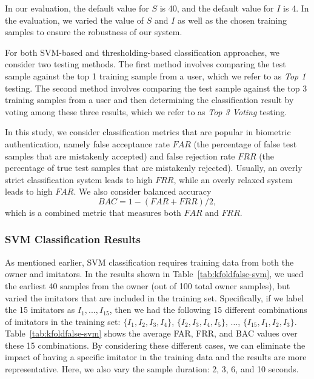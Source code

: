 In our evaluation, the default value for $S$ is 40, and the default value for 
$I$ is 4. In the evaluation, we varied the value of $S$ and $I$ as well as the 
chosen training samples to ensure the robustness of our system.

For both SVM-based and thresholding-based classification approaches, we 
consider two testing methods. The first method involves comparing the test 
sample against the top 1 training sample from a user, which we refer to as 
\emph{Top 1} testing. The second method involves comparing the test sample 
against the top 3 training samples from a user and then determining the 
classification result by voting among these three results, which we refer to 
as \emph{Top 3 Voting} testing.

In this study, we consider classification metrics that are popular in 
biometric authentication, namely false acceptance rate $FAR$ (the percentage 
of false test samples that are mistakenly accepted) and false rejection rate 
$FRR$ (the percentage of true test samples that are mistakenly rejected). 
Usually, an overly strict classification system leads to high $FRR$, while an 
overly relaxed system leads to high $FAR$. We also consider balanced accuracy 
$$BAC = 1 - (FAR+FRR)/2,$$ which is a combined metric that measures both $FAR$ 
and $FRR$.


\iffalse
\subsubsection{SVM Classification Results}

As mentioned earlier, SVM classification requires training data from both the 
owner and imitators. In the results shown in Table~\ref{tab:kfoldfalse-svm}, 
we used the earliest 40 samples from the owner (out of 100 total owner 
samples), but varied the imitators that are included in the training set. 
Specifically, if we label the 15 imitators as $I_1, ..., I_{15}$, then we had 
the following 15 different combinations of imitators in the training set: 
$\{I_1, I_2, I_3, I_4\}$, $\{I_2, I_3, I_4, I_5\}$, $\dots$, $\{I_{15}, I_1, 
I_2, I_3\}$.  Table~\ref{tab:kfoldfalse-svm} shows the average FAR, FRR, and 
BAC values over these 15 combinations. By considering these different cases, 
we can eliminate the impact of having a specific imitator in the training data 
and the results are more representative. Here, we also vary the sample 
duration: 2, 3, 6, and 10 seconds.

